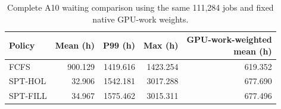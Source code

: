 \begin{table}[H]\centering
\caption{Complete A10 waiting comparison using the same 111,284 jobs and fixed native GPU-work weights.}
\label{tab:r2a10}
\begin{tabular}{lrrrr}
\toprule
Policy & Mean (h) & P99 (h) & Max (h) & \shortstack{GPU-work-weighted\\mean (h)}\\
\midrule
FCFS & 900.129 & 1419.616 & 1423.254 & 619.352\\
SPT-HOL & 32.906 & 1542.181 & 3017.288 & 677.690\\
SPT-FILL & 34.967 & 1575.462 & 3015.311 & 677.496\\
\bottomrule
\end{tabular}

\end{table}
